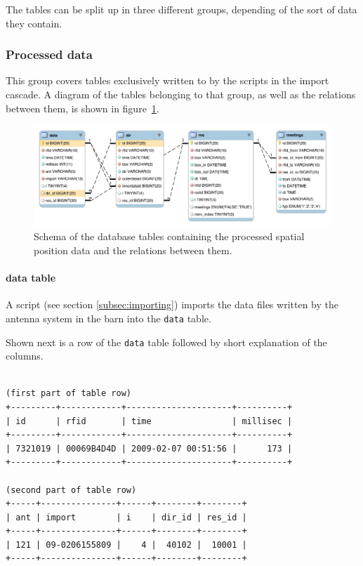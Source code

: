 The tables can be split up in three different groups, depending of the sort of data they contain. 

\subsubsection{Processed data}

This group covers tables exclusively written to by the scripts in the import cascade. A diagram of the tables belonging to that group, as well as the relations between them, is shown in figure~\ref{fig:processed_data_schema}.

\clearpage 

\begin{figure}[!htpb]
\begin{center}
  \includegraphics[width=\textwidth]{assets/pdf/processed_data_schema.pdf}
  \caption[Schema of database tables containing the processed data]{Schema of the database tables containing the processed spatial position data and the relations between them.}
  \label{fig:processed_data_schema}
\end{center}
\end{figure} 


\paragraph{data table}
\label{para:data_table}

A script (see section \ref{subsec:importing}) imports the data files written by the antenna system in the barn into the \lstinline|data| table.

Shown next is a row of the \lstinline|data| table followed by short explanation of the columns.

\codescript
{}
\begin{lstlisting}[frame=none]

(first part of table row)
+---------+------------+---------------------+----------+
| id      | rfid       | time                | millisec |
+---------+------------+---------------------+----------+
| 7321019 | 00069B4D4D | 2009-02-07 00:51:56 |      173 |
+---------+------------+---------------------+----------+

(second part of table row)
+-----+---------------+------+--------+--------+
| ant | import        | i    | dir_id | res_id |
+-----+---------------+------+--------+--------+
| 121 | 09-0206155809 |    4 |  40102 |  10001 |
+-----+---------------+------+--------+--------+

\end{lstlisting}

